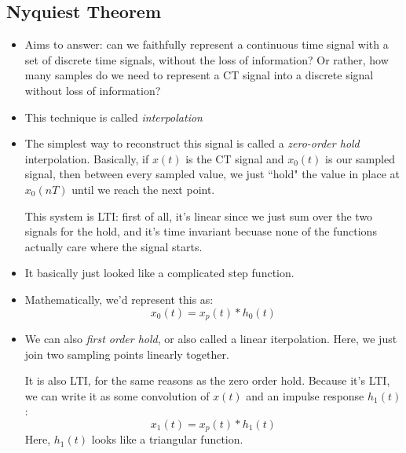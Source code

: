 \subsection{Nyquiest Theorem}
\begin{itemize}
	\item Aims to answer: can we faithfully represent a continuous time signal with a set of discrete time signals, 
		without the loss of information? Or rather, how many samples do we need to represent a CT signal into a 
		discrete signal without loss of information? 
	\item This technique is called \textit{interpolation}
	\item The simplest way to reconstruct this signal is called a \textit{zero-order hold} interpolation. Basically, 
		if \( x(t)  \) is the CT signal and \( x_0(t) \) is our sampled signal, then between 
		every sampled value, we just ``hold" the value in place at \( x_0(nT) \) until we reach the next point. 

		This system is LTI: first of all, it's linear since we just sum over the two signals for the hold, and it's 
		time invariant becuase none of the functions actually care where the signal starts. 
	\item It basically just looked like a complicated step function. 
	\item Mathematically, we'd represent this as:
		\[
		x_0(t) = x_p(t)* h_0(t)
		\] 
	\item We can also \textit{first order hold}, or also called a linear iterpolation. Here, we just join 
		two sampling points linearly together. 

		It is also LTI, for the same reasons as the zero order hold. Because it's LTI, we can write it as 
		some convolution of \( x(t) \) and an impulse response \( h_1(t) \):
		\[
		x_1(t) = x_p(t) * h_1(t) 
		\] 
		Here, \( h_1(t) \) looks like a triangular function. 
\end{itemize}
